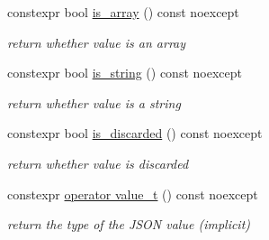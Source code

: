 \begin{DoxyCompactItemize}
constexpr bool \hyperlink{classnlohmann_1_1basic__json_a256a4cef002023acab3c9d75b569f54a}{is\+\_\+array} () const noexcept
\begin{DoxyCompactList}\small\item\em return whether value is an array \end{DoxyCompactList}\item 
constexpr bool \hyperlink{classnlohmann_1_1basic__json_a409e854d754f5684b2cce74ee20dbc3b}{is\+\_\+string} () const noexcept
\begin{DoxyCompactList}\small\item\em return whether value is a string \end{DoxyCompactList}\item 
constexpr bool \hyperlink{classnlohmann_1_1basic__json_a1002d187e05b5323bda5de124cbe95a8}{is\+\_\+discarded} () const noexcept
\begin{DoxyCompactList}\small\item\em return whether value is discarded \end{DoxyCompactList}\item 
constexpr \hyperlink{classnlohmann_1_1basic__json_a02397f02bb1182bf1e1bc7ecf7f2c227}{operator value\+\_\+t} () const noexcept
\begin{DoxyCompactList}\small\item\em return the type of the J\+S\+ON value (implicit) \end{DoxyCompactList}\end{DoxyCompactItemize}
